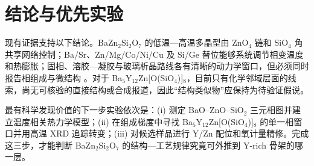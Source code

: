 \section{结论与优先实验}

现有证据支持以下结论。BaZn$_2$Si$_2$O$_7$ 的低温—高温多晶型由 ZnO$_4$ 链和 SiO$_4$ 角共享网络控制；Ba/Sr、Zn/Mg/Co/Ni/Cu 及 Si/Ge 替位能够系统调节相变温度和热膨胀；固相、溶胶—凝胶与玻璃析晶路线各有清晰的动力学窗口，但必须同时报告相组成与微结构 \cite{lin1999phase,kerstan2012thermal,thieme2015ba1,thieme2016new,bocker2012in}。对于 Ba$_5$Y$_{12}$Zn[O(SiO$_4$)]$_8$，目前只有化学邻域层面的线索，尚无可核验的直接结构或合成报道，因此“结构类似物”应保持为待验证假说。

最有科学发现价值的下一步实验依次是：(i) 测定 BaO--ZnO--SiO$_2$ 三元相图并建立温度相关热力学模型；(ii) 在组成梯度中寻找 Ba$_5$Y$_{12}$Zn[O(SiO$_4$)]$_8$ 的单一相窗口并用高温 XRD 追踪转变；(iii) 对候选样品进行 Y\slash Zn 配位和氧计量精修。完成这三步，才能判断 BaZn$_2$Si$_2$O$_7$ 的结构—工艺规律究竟可外推到 Y-rich 骨架的哪一层。
